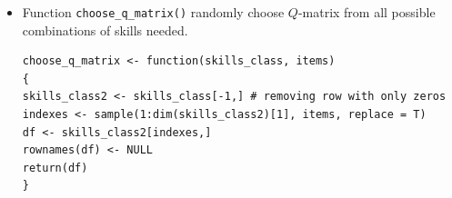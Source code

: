 \documentclass[english]{pwr_wmat_praca_dyplomowa}
\theoremstyle{plain}
\theoremstyle{definition}
\numberwithin{theorem}{chapter}
\begin{document}
\begin{itemize}
\item Function \texttt{choose\_q\_matrix()} randomly choose $Q$-matrix from all possible combinations of skills needed. 

\begin{verbatim}
choose_q_matrix <- function(skills_class, items)
{
skills_class2 <- skills_class[-1,] # removing row with only zeros
indexes <- sample(1:dim(skills_class2)[1], items, replace = T)
df <- skills_class2[indexes,]
rownames(df) <- NULL
return(df)
}
\end{verbatim}
	
\end{itemize}




\newpage
{} 

\end{document}
